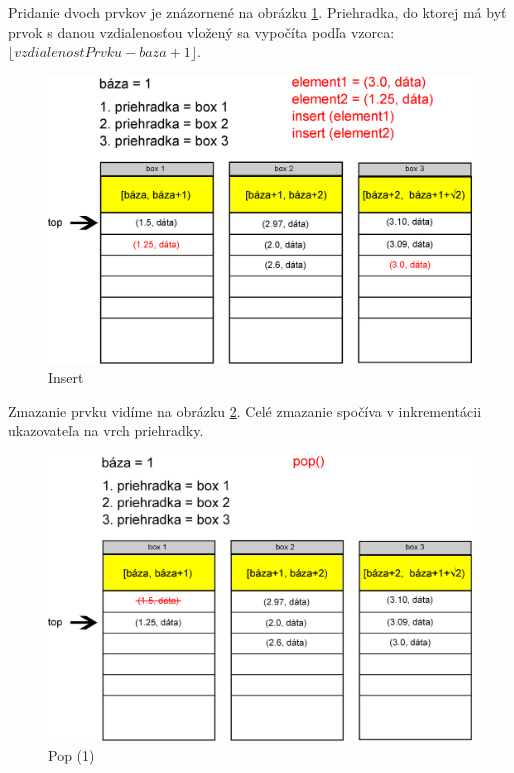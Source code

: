 Pridanie dvoch prvkov je znázornené na obrázku \ref{fig:priehradky_i}. Priehradka, do ktorej má byť prvok s danou vzdialenosťou vložený sa vypočíta podľa vzorca: $ \lfloor vzdialenostPrvku - baza +1 \rfloor $.


\begin{figure}[h]
\centering
\includegraphics[width=\textwidth]{./img/priehradky_naplnene_default_i.eps}
\caption{Insert}
\label{fig:priehradky_i}
\end{figure}


Zmazanie prvku vidíme na obrázku \ref{fig:priehradky_i_d1}.
Celé zmazanie spočíva v inkrementácii ukazovateľa na vrch priehradky.

\begin{figure}[h]
\centering
\includegraphics[width=\textwidth]{./img/priehradky_naplnene_default_i_d1.eps}
\caption{Pop (1)}
\label{fig:priehradky_i_d1}
\end{figure}



